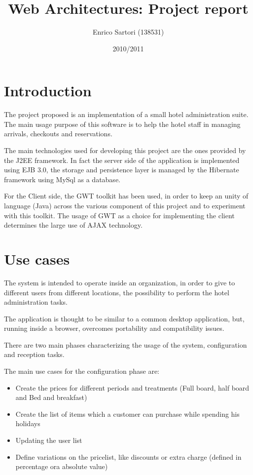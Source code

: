 \documentclass [11pt]{article}
\begin{document}
\title{Web Architectures: Project report}
\date{2010/2011}
\author{Enrico Sartori (138531)}
\maketitle
\tableofcontents


\section{Introduction}
The project proposed is an implementation of a small hotel administration
suite. The main usage purpose of this software is to help the hotel staff
in managing arrivals, checkouts and reservations.

The main technologies used for developing this project are the ones
provided by the J2EE framework. In fact the server side of the application
is implemented using EJB 3.0, the storage and persistence layer is managed
by the Hibernate framework using MySql as a database.

For the Client side, the GWT toolkit has been used, in order to keep an
unity of language (Java) across the various component of this project and
to experiment with this toolkit.
The usage of GWT as a choice for implementing the client determines the
large use of AJAX technology.

\section {Use cases}
The system is intended to operate inside an organization, in order to
give to different users from different locations, the possibility to
perform the hotel administration tasks.

The application is thought to be similar to a common desktop application,
but, running inside a browser, overcomes portability and compatibility
issues.

There are two main phases characterizing the usage of the system,
configuration and reception tasks.

The main use cases for the configuration phase are:
\begin{itemize}
\item Create the prices for different periods and treatments (Full board,
half board and Bed and breakfast)
\item Create the list of items which a customer can purchase while
spending his holidays
\item Updating the user list
\item Define variations on the pricelist, like discounts or extra charge
(defined in percentage ora absolute value)
\end{itemize}
\end{document}
